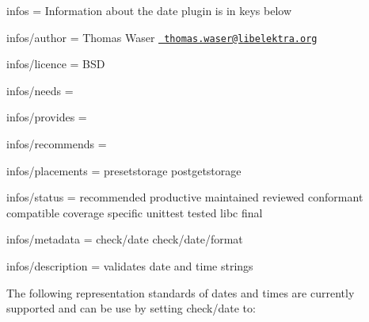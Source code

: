 
\begin{DoxyItemize}
\item infos = Information about the date plugin is in keys below
\item infos/author = Thomas Waser \href{mailto:thomas.waser@libelektra.org}{\texttt{ thomas.\+waser@libelektra.\+org}}
\item infos/licence = B\+SD
\item infos/needs =
\item infos/provides =
\item infos/recommends =
\item infos/placements = presetstorage postgetstorage
\item infos/status = recommended productive maintained reviewed conformant compatible coverage specific unittest tested libc final
\item infos/metadata = check/date check/date/format
\item infos/description = validates date and time strings
\end{DoxyItemize}

The following representation standards of dates and times are currently supported and can be use by setting {\ttfamily check/date} to\+:


